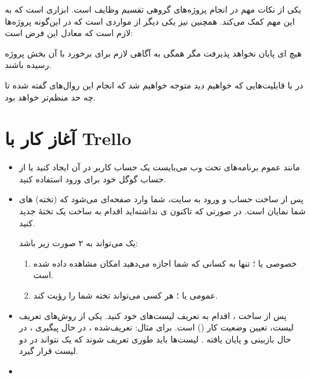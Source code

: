 \documentclass[]{article}
\begin{document}
یکی از نکات مهم در انجام پروژه‌های گروهی تقسیم وظایف است.  ابزاری است که به این مهم کمک می‌کند. همچنین
 نیز یکی دیگر از مواردی است که در این‌گونه پروژه‌ها  لازم است که معادل این فرض است:

هیچ  ای پایان نخواهد پذیرفت مگر همگی به آگاهی لازم برای برخورد با آن بخش پروژه رسیده باشند.

در  با قابلیت‌هایی که خواهیم دید متوجه خواهیم شد که انجام این روال‌های گفته شده تا چه حد منظم‌تر خواهد بود.

\newpage

\section*{{\titr آغاز کار با Trello}}

\begin{itemize}

\item

مانند عموم برنامه‌های تحت وب می‌بایست یک حساب کاربر در آن ایجاد کنید یا از حساب گوگل خود برای ورود استفاده کنید.



\item

پس از ساخت حساب و ورود به سایت، شما وارد صفحه‌ای می‌شود که  (تخته)‌ های شما نمایان است. در صورتی که تاکنون ی نداشته‌اید اقدام به ساخت یک تختهٔ جدید کنید.

یک  می‌تواند به ۲ صورت زیر باشد:

\begin{enumerate}

\item
خصوصی یا ؛ تنها به کسانی که شما اجازه می‌دهید امکان مشاهده داده شده است.

\item
عمومی یا ؛ هر کسی می‌تواند تخته شما را رؤیت کند.

\end{enumerate}


\item

پس از ساخت ، اقدام به تعریف لیست‌های خود کنید. یکی از روش‌های تعریف لیست، تعیین وضعیت کار () است. برای مثال: تعریف‌شده ، در حال پیگیری ، در حال بازبینی  و پایان یافته . لیست‌ها باید طوری تعریف شوند که یک  نتواند در دو لیست قرار گیرد.
\item


\end{itemize}
\end{document}
